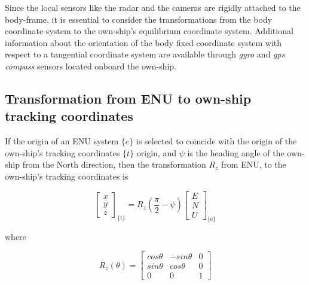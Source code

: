 Since the local sensors like the radar and the cameras are rigidly attached to the body-frame, it is essential to consider the transformations from the body coordinate system to the own-ship's equilibrium coordinate system. Additional information about the orientation of the body fixed coordinate system with respect to a tangential coordinate system are available through \emph{gyro} and \emph{gps compass} sensors located onboard the own-ship. 

\subsection{Transformation from ENU to own-ship tracking coordinates}\label{ssec:transformation-from-enu-to-own-ship-tracking-coordinates}


If the origin of an ENU system $\{e\}$ is selected to coincide with the origin of the own-ship's tracking coordinates $\{t\}$ origin, and $\psi$ is the heading angle of the own-ship from the North direction, then the transformation $R_z$ from ENU, to the own-ship's tracking coordinates is





\begin{equation}
\begin{bmatrix}
x \\
y \\
z
\end{bmatrix}_{\text{\{t\}}} = R_{z}(\frac{\pi}{2}-\psi)
\begin{bmatrix}
E \\
N \\
U
\end{bmatrix}_{\text{\{e\}}}
\end{equation}

where

$$
R_{z}(\theta)=\begin{bmatrix}
cos\theta &-sin\theta &0\\
sin\theta &cos\theta &0 \\
0 &0 &1
\end{bmatrix}
$$

%
